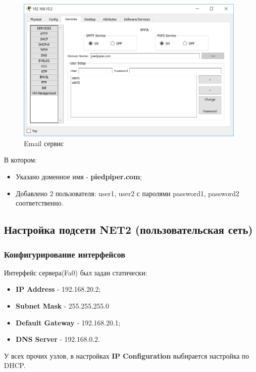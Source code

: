 \begin{figure}[H]
  \centering
  \includegraphics[width=.8\textwidth]{img/net1_10_2__1}
  \caption{Email сервис}
\end{figure}
В котором:
\begin{itemize}
\item Указано доменное имя - \textbf{piedpiper.com};
\item Добавлено 2 пользователя: user1, user2 с паролями password1, password2 соответственно.
\end{itemize}

\subsection{Настройка подсети NET2 (пользовательская сеть)}
\subsubsection{Конфигурирование интерфейсов}
Интерфейс сервера(Fa0) был задан статически:
\begin{itemize}
\item \textbf{IP Address} - 192.168.20.2;
\item \textbf{Subnet Mask} - 255.255.255.0
\item \textbf{Default Gateway} - 192.168.20.1;
\item \textbf{DNS Server} - 192.168.0.2.
\end{itemize}
У всех прочих узлов, в настройках \textbf{IP Configuration} выбирается настройка по DHCP.
